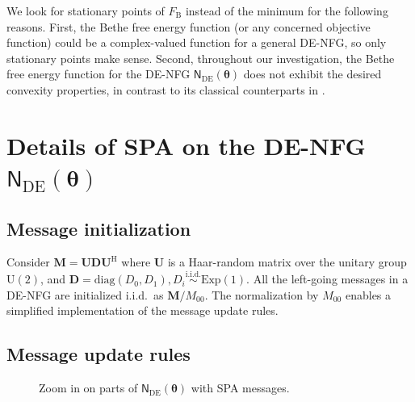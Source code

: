\documentclass[conference]{IEEEtran}
\theoremstyle{plain}
\theoremstyle{definition}
\newcommand{\B}{\mathrm{B}}
\newcommand{\sfn}{\mathsf{N}}
\newcommand{\tfr}[1]{\widetilde{f}^{\mathrm{R}}_{ #1 }}
\newcommand{\tfl}[1]{\widetilde{f}^{\mathrm{L}}_{ #1 }}
\newcommand{\tfe}[1]{\widetilde {f}_{ #1 }}
\newcommand{\txr}[1]{\widetilde{x}^{\mathrm{R}}_{ #1 }}
\newcommand{\txl}[1]{\widetilde{x}^{\mathrm{L}}_{ #1 }}
\newcommand{\muleft}[2]{\overleftarrow{\boldsymbol{\mu}}^{\mathrm{#1}}_{#2}}
\newcommand{\muright}[2]{\overrightarrow{\boldsymbol{\mu}}^{\mathrm{#1}}_{#2}}
\newcommand{\btheta}{\boldsymbol{\theta}}
\newcommand{\sfnDE}{\sfn_{\mathrm{DE}}}
\begin{document}
 We look for stationary points of $F_\B$ instead of the minimum for the
 following reasons. First, the Bethe free energy function (or any concerned
 objective function) could be a complex-valued function for a general DE-NFG,
 so only stationary points make sense. Second, throughout our investigation,
 the Bethe free energy function for the DE-NFG \(\sfnDE(\btheta)\) does not
 exhibit the desired convexity properties, in contrast to its classical
 counterparts in \cite{vontobelBethePermanentNonnegative2013}.


 \section{Details of SPA on the DE-NFG \(\sfnDE(\btheta)\)}\label{appx:spa:details}

 \subsection{Message initialization}
 Consider $\mathbf M=\mathbf U \mathbf D \mathbf U^\mathrm H$ where $\mathbf U$
 is a Haar-random matrix over the unitary group $\mathrm U(2)$, and $\mathbf
 D=\mathrm{diag}(D_0,D_1),D_i\overset{\mathrm {i.i.d.}}{\sim}\mathrm{Exp}(1)$.
 All the left-going messages in a DE-NFG are initialized i.i.d.~as $\mathbf
 M/M_{00}$. The normalization by $M_{00}$ enables a simplified implementation
 of the message update rules.

 \subsection{Message update rules}
 \begin{figure}[t]
  \centering
{}
  \caption{Zoom in on parts of $\sfnDE(\btheta)$ with SPA messages.}\label{fig:DENFG:SPA}
 \end{figure}
\end{document}
